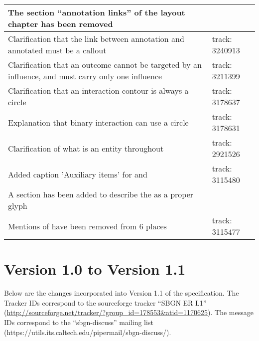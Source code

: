 \begin{center}
\label{tab:revision history 1.2}
\tablelasttail{\hline}
\begin{supertabular}{|p{0.75\textwidth}|p{0.25\textwidth}|}\hline
The section ``annotation links'' of the layout chapter has been removed &  \\\hline
Clarification that the link between annotation and annotated must be a callout & track: 3240913 \\\hline
Clarification that an outcome cannot be targeted by an influence, and must carry only one influence & track: 3211399 \\\hline
Clarification that an interaction contour is always a circle & track: 3178637 \\\hline
Explanation that binary interaction can use a circle & track: 3178631 \\\hline
Clarification of what is an entity throughout & track: 2921526\\\hline
Added caption 'Auxiliary items' for  and  & track: 3115480\\\hline
A section has been added to describe the  as a proper glyph & \\\hline
Mentions of  have been removed from 6 places & track: 3115477\\\hline
\end{supertabular}
\end{center}


\section{Version 1.0 to Version 1.1}

Below are the changes incorporated into Version 1.1 of the \SBGNERLone specification. The Tracker IDs correspond to the sourceforge tracker ``SBGN ER L1'' (\url{http://sourceforge.net/tracker/?group_id=178553&atid=1170625}). The message IDs correspond to the ``sbgn-discuss'' mailing list (https://utils.its.caltech.edu/pipermail/sbgn-discuss/).

